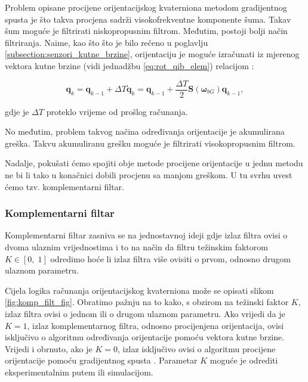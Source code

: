 \documentclass[times, utf8, diplomski, numeric]{templates/template}
\begin{document}
{{{{                Problem opisane procijene orijentacijskog kvaterniona metodom gradijentnog spusta je što takva procjena sadrži visokofrekventne komponente šuma. Takav šum moguće je filtrirati niskopropusnim filtrom. Međutim, postoji bolji način filtriranja. Naime, kao što što je bilo rečeno u poglavlju \ref{subsection:senzori_kutne_brzine}, orijentaciju je moguće izračunati iz mjerenog vektora kutne brzine (vidi jednadžbu \ref{eq:rot_qib_elem}) relacijom \cite{uvod_u_svemirske}:

                \begin{equation}
                    \boldsymbol{q}_k = \boldsymbol{q}_{k-1} + \Delta T \dot{\boldsymbol{q}}_k = \boldsymbol{q}_{k-1} + \frac{\Delta T}{2} \boldsymbol{S}(\boldsymbol{\omega}_{bG}) \boldsymbol{q}_{k-1},
                \end{equation}

                gdje je $\Delta T$ proteklo vrijeme od prošlog računanja.

                No međutim, problem takvog načina određivanja orijentacije je akumulirana greška. Takvu akumuliranu grešku moguće je filtrirati visokopropusnim filtrom. 

                Nadalje, pokušati ćemo spojiti obje metode procijene orijentacije u jednu metodu ne bi li tako u konačnici dobili procjenu sa manjom greškom. U tu svrhu uvest ćemo tzv. komplementarni filtar.
            }

            \subsubsection{Komplementarni filtar}{
                Komplementarni filtar zasniva se na jednostavnoj ideji gdje izlaz filtra ovisi o dvoma ulaznim vrijednostima i to na način da filtru težinskim faktorom $K \in \left[ 0, \; 1\right]$ odredimo hoće li izlaz filtra više ovisiti o prvom, odnosno drugom ulaznom parametru. 

                Cijela logika računanja orijentacijskog kvaterniona može se opisati slikom \ref{fig:komp_filt_fig}. Obratimo pažnju na to kako, s obzirom na težinski faktor $K$, izlaz filtra ovisi o jednom ili o drugom ulaznom parametru. Ako vrijedi da je $K = 1$, izlaz komplementarnog filtra, odnosno procijenjena orijentacija, ovisi isključivo o algoritmu određivanja orijentacije pomoću vektora kutne brzine. Vrijedi i obrnuto, ako je $K = 0$, izlaz isključivo ovisi o algoritmu procijene orijentacije pomoću gradijentnog spusta \cite{grad_desc}. Parametar $K$ moguće je odrediti eksperimentalnim putem ili simulacijom. 

}}}}
\end{document}
